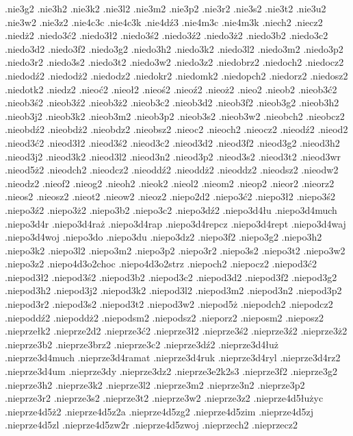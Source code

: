 {.nie3g2
.nie3h2
.nie3k2
.nie3l2
.nie3m2
.nie3p2
.nie3r2
.nie3s2
.nie3t2
.nie3u2
.nie3w2
.nie3z2
.nie4c3c
.nie4c3k
.nie4d\'z3
.nie4m3c
.nie4m3k
.niech2
.niecz2
.nied\.z2
.niedo3\'c2
.niedo3\l 2
.niedo3\'s2
.niedo3\'z2
.niedo3\.z2
.niedo3b2
.niedo3c2
.niedo3d2
.niedo3f2
.niedo3g2
.niedo3h2
.niedo3k2
.niedo3l2
.niedo3m2
.niedo3p2
.niedo3r2
.niedo3s2
.niedo3t2
.niedo3w2
.niedo3z2
.niedobrz2
.niedoch2
.niedocz2
.niedod\'z2
.niedod\.z2
.niedodz2
.niedokr2
.niedomk2
.niedopch2
.niedorz2
.niedosz2
.niedotk2
.niedz2
.nieo\'c2
.nieo\l 2
.nieo\'s2
.nieo\'z2
.nieo\.z2
.nieo2
.nieob2
.nieob3\'c2
.nieob3\'s2
.nieob3\'z2
.nieob3\.z2
.nieob3c2
.nieob3d2
.nieob3f2
.nieob3g2
.nieob3h2
.nieob3j2
.nieob3k2
.nieob3m2
.nieob3p2
.nieob3s2
.nieob3w2
.nieobch2
.nieobcz2
.nieobd\'z2
.nieobd\.z2
.nieobdz2
.nieobsz2
.nieoc2
.nieoch2
.nieocz2
.nieod\'z2
.nieod2
.nieod3\'c2
.nieod3\l 2
.nieod3\'s2
.nieod3c2
.nieod3d2
.nieod3f2
.nieod3g2
.nieod3h2
.nieod3j2
.nieod3k2
.nieod3l2
.nieod3n2
.nieod3p2
.nieod3s2
.nieod3t2
.nieod3wr
.nieod5\.z2
.nieodch2
.nieodcz2
.nieodd\'z2
.nieodd\.z2
.nieoddz2
.nieodsz2
.nieodw2
.nieodz2
.nieof2
.nieog2
.nieoh2
.nieok2
.nieol2
.nieom2
.nieop2
.nieor2
.nieorz2
.nieos2
.nieosz2
.nieot2
.nieow2
.nieoz2
.niepo2d2
.niepo3\'c2
.niepo3\l 2
.niepo3\'s2
.niepo3\'z2
.niepo3\.z2
.niepo3b2
.niepo3c2
.niepo3d\'z2
.niepo3d4\l u
.niepo3d4much
.niepo3d4r\kecz
.niepo3d4ra\.z
.niepo3d4rap
.niepo3d4repcz
.niepo3d4rept
.niepo3d4waj
.niepo3d4woj
.niepo3do
.niepo3du
.niepo3dz2
.niepo3f2
.niepo3g2
.niepo3h2
.niepo3k2
.niepo3l2
.niepo3m2
.niepo3p2
.niepo3r2
.niepo3s2
.niepo3t2
.niepo3w2
.niepo3z2
.niepo4d3o2choc
.niepo4d3o2strz
.niepoch2
.niepocz2
.niepod3\'c2
.niepod3\l 2
.niepod3\'s2
.niepod3b2
.niepod3c2
.niepod3d2
.niepod3f2
.niepod3g2
.niepod3h2
.niepod3j2
.niepod3k2
.niepod3l2
.niepod3m2
.niepod3n2
.niepod3p2
.niepod3r2
.niepod3s2
.niepod3t2
.niepod3w2
.niepod5\.z
.niepodch2
.niepodcz2
.niepodd\'z2
.niepodd\.z2
.niepodsm2
.niepodsz2
.nieporz2
.nieposm2
.nieposz2
.nieprze\l k2
.nieprze2d2
.nieprze3\'c2
.nieprze3\l 2
.nieprze3\'s2
.nieprze3\'z2
.nieprze3\.z2
.nieprze3b2
.nieprze3brz2
.nieprze3c2
.nieprze3d\'z2
.nieprze3d4\l u\.z
.nieprze3d4much
.nieprze3d4ramat
.nieprze3d4ruk
.nieprze3d4ryl
.nieprze3d4rz2
.nieprze3d4um
.nieprze3dy
.nieprze3dz2
.nieprze3e2k2s3
.nieprze3f2
.nieprze3g2
.nieprze3h2
.nieprze3k2
.nieprze3l2
.nieprze3m2
.nieprze3n2
.nieprze3p2
.nieprze3r2
.nieprze3s2
.nieprze3t2
.nieprze3w2
.nieprze3z2
.nieprze4d5\l u\.zyc
.nieprze4d5\.z2
.nieprze4d5z2a
.nieprze4d5zg2
.nieprze4d5zim
.nieprze4d5zj
.nieprze4d5zl
.nieprze4d5zw2r
.nieprze4d5zwoj
.nieprzech2
.nieprzecz2
}
